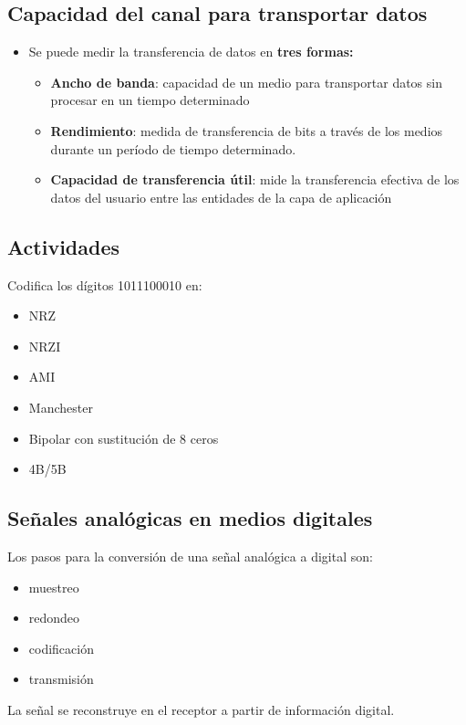 \documentclass[11pt]{article}
\begin{document}
\subsection{Capacidad del canal para transportar datos}
\label{sec:orgd9bea6d}
\begin{itemize}
\item Se puede medir la transferencia de datos en \textbf{tres formas:}
\begin{itemize}
\item \textbf{Ancho de banda}: capacidad de un medio para transportar datos sin procesar en un tiempo determinado
\item \textbf{Rendimiento}: medida de transferencia de bits a través de los medios durante un período de tiempo determinado.
\item \textbf{Capacidad de transferencia útil}: mide la transferencia efectiva de los datos del usuario entre las entidades de la capa de aplicación
\end{itemize}
\end{itemize}

\subsection{Actividades}
\label{sec:org3e2fa3a}
Codifica los dígitos 1011100010 en:
\begin{itemize}
\item NRZ
\item NRZI
\item AMI
\item Manchester
\item Bipolar con sustitución de 8 ceros
\item 4B/5B
\end{itemize}

\subsection{Señales analógicas en medios digitales}
\label{sec:org9ff43d0}
Los pasos para la conversión de una señal analógica a digital son:
\begin{itemize}
\item muestreo
\item redondeo
\item codificación
\item transmisión
\end{itemize}

La señal se reconstruye en el receptor a partir de información digital.
\end{document}
